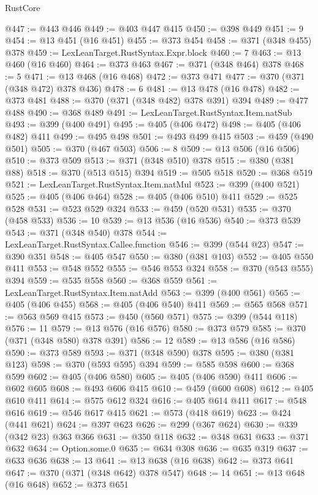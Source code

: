 \begin{lexlean}{RustCore}
\begin{coremodule}
@447 := @443 @446
@449 := @403 @447 @415
@450 := @398 @449
@451 := 9
@454 := @13 @451 (@16 @451)
@455 := @373 @454
@458 := @371 (@348 @455) @378
@459 := LexLeanTarget.RustSyntax.Expr.block
@460 := 7
@463 := @13 @460 (@16 @460)
@464 := @373 @463
@467 := @371 (@348 @464) @378
@468 := 5
@471 := @13 @468 (@16 @468)
@472 := @373 @471
@477 := @370 (@371 (@348 @472) @378 @436)
@478 := 6
@481 := @13 @478 (@16 @478)
@482 := @373 @481
@488 := @370 (@371 (@348 @482) @378 @391) @394
@489 := @477 @488
@490 := @368 @489
@491 := LexLeanTarget.RustSyntax.Item.natSub
@493 := @399 (@400 @491)
@495 := @405 (@406 @472)
@498 := @405 (@406 @482) @411
@499 := @495 @498
@501 := @493 @499 @415
@503 := @459 (@490 @501)
@505 := @370 (@467 @503)
@506 := 8
@509 := @13 @506 (@16 @506)
@510 := @373 @509
@513 := @371 (@348 @510) @378
@515 := @380 (@381 @88)
@518 := @370 (@513 @515) @394
@519 := @505 @518
@520 := @368 @519
@521 := LexLeanTarget.RustSyntax.Item.natMul
@523 := @399 (@400 @521)
@525 := @405 (@406 @464)
@528 := @405 (@406 @510) @411
@529 := @525 @528
@531 := @523 @529 @324
@533 := @459 (@520 @531)
@535 := @370 (@458 @533)
@536 := 10
@539 := @13 @536 (@16 @536)
@540 := @373 @539
@543 := @371 (@348 @540) @378
@544 := LexLeanTarget.RustSyntax.Callee.function
@546 := @399 (@544 @23)
@547 := @390 @351
@548 := @405 @547
@550 := @380 (@381 @103)
@552 := @405 @550 @411
@553 := @548 @552
@555 := @546 @553 @324
@558 := @370 (@543 @555) @394
@559 := @535 @558
@560 := @368 @559
@561 := LexLeanTarget.RustSyntax.Item.natAdd
@563 := @399 (@400 @561)
@565 := @405 (@406 @455)
@568 := @405 (@406 @540) @411
@569 := @565 @568
@571 := @563 @569 @415
@573 := @450 (@560 @571)
@575 := @399 (@544 @118)
@576 := 11
@579 := @13 @576 (@16 @576)
@580 := @373 @579
@585 := @370 (@371 (@348 @580) @378 @391)
@586 := 12
@589 := @13 @586 (@16 @586)
@590 := @373 @589
@593 := @371 (@348 @590) @378
@595 := @380 (@381 @123)
@598 := @370 (@593 @595) @394
@599 := @585 @598
@600 := @368 @599
@602 := @405 (@406 @580)
@605 := @405 (@406 @590) @411
@606 := @602 @605
@608 := @493 @606 @415
@610 := @459 (@600 @608)
@612 := @405 @610 @411
@614 := @575 @612 @324
@616 := @405 @614 @411
@617 := @548 @616
@619 := @546 @617 @415
@621 := @573 (@418 @619)
@623 := @424 (@441 @621)
@624 := @397 @623
@626 := @299 (@367 @624)
@630 := @339 (@342 @23) @363 @366
@631 := @350 @118
@632 := @348 @631
@633 := @371 @632
@634 := Option.some.{0}
@635 := @634 @308
@636 := @635 @319
@637 := @633 @636
@638 := 13
@641 := @13 @638 (@16 @638)
@642 := @373 @641
@647 := @370 (@371 (@348 @642) @378 @547)
@648 := 14
@651 := @13 @648 (@16 @648)
@652 := @373 @651

\end{coremodule}
\end{lexlean}
